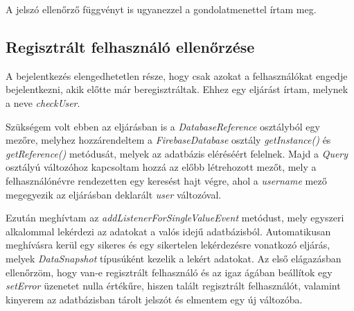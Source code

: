 \documentclass{thesis-ekf}
\begin{document}
A jelszó ellenőrző függvényt is ugyanezzel a gondolatmenettel írtam meg.

\renewcommand{\lstlistingname}{kód}


\subsection{Regisztrált felhasználó ellenőrzése}
\label{Regisztrált felhasználó ellenőrzése}
A bejelentkezés elengedhetetlen része, hogy csak azokat a felhasználókat engedje bejelentkezni, akik előtte már beregisztráltak. Ehhez egy eljárást írtam, melynek a neve \textit{checkUser}. 

Szükségem volt ebben az eljárásban is a \textit{DatabaseReference} osztályból egy mezőre, melyhez hozzárendeltem a \textit{FirebaseDatabase} osztály \textit{getInstance()} és \textit{getReference()} metódusát, melyek az adatbázis eléréséért felelnek. Majd a \textit{Query} osztályú változóhoz kapcsoltam hozzá az előbb létrehozott mezőt, mely a felhasználónévre rendezetten egy keresést hajt végre, ahol a \textit{username} mező megegyezik az eljárásban deklarált \textit{user} változóval.

\renewcommand{\lstlistingname}{kód}


Ezután meghívtam az \textit{addListenerForSingleValueEvent} metódust, mely egyszeri alkalommal lekérdezi az adatokat a valós idejű adatbázisból. Automatikusan meghívásra kerül egy sikeres és egy sikertelen lekérdezésre vonatkozó eljárás, melyek \textit{DataSnapshot} típusúként kezelik a lekért adatokat. Az első elágazásban ellenőrzöm, hogy van-e regisztrált felhasználó és az igaz ágában beállítok egy \textit{setError} üzenetet nulla értékűre, hiszen talált regisztrált felhasználót, valamint kinyerem az adatbázisban tárolt jelszót és elmentem egy új változóba.
\end{document}
